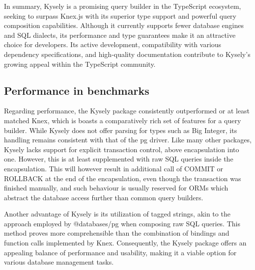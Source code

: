 In summary, Kysely is a promising query builder in the TypeScript ecosystem,
seeking to surpass Knex.js with its superior type support and powerful query
composition capabilities. Although it currently supports fewer database engines
and SQL dialects, its performance and type guarantees make it an attractive
choice for developers. Its active development, compatibility with various
dependency specifications, and high-quality documentation contribute to Kysely's
growing appeal within the TypeScript community.

\subsection*{Performance in benchmarks}

Regarding performance, the Kysely package consistently outperformed or at least
matched Knex, which is boasts a comparatively rich set of features for a query
builder. While Kysely does not offer parsing for types such as Big Integer, its
handling remains consistent with that of the pg driver. Like many other
packages, Kysely lacks support for explicit transaction control, above
encapsulation into one. However, this is at least supplemented with raw SQL
queries inside the encapsulation. This will however result in additional call of
COMMIT or ROLLBACK at the end of the encapsulation, even though the transaction
was finished manually, and such behaviour is usually reserved for ORMs which
abstract the database access further than common query builders.

Another advantage of Kysely is its utilization of tagged strings, akin to the
approach employed by @databases/pg when composing raw SQL queries. This method
proves more comprehensible than the combination of bindings and function calls
implemented by Knex. Consequently, the Kysely package offers an appealing
balance of performance and usability, making it a viable option for various
database management tasks.
